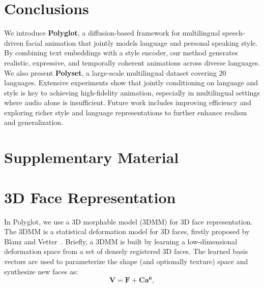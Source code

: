 \documentclass[a4paper, 10pt, conference]{ieeeconf}      %
\begin{document}
\section{Conclusions}
\label{sec:conclusions}
We introduce \textbf{Polyglot}, a diffusion-based framework for multilingual speech-driven facial animation that jointly models language and personal speaking style. By combining text embeddings with a style encoder, our method generates realistic, expressive, and temporally coherent animations across diverse languages.
We also present \textbf{Polyset}, a large-scale multilingual dataset covering 20 languages. Extensive experiments show that jointly conditioning on language and style is key to achieving high-fidelity animation, especially in multilingual settings where audio alone is insufficient.
Future work includes improving efficiency and exploring richer style and language representations to further enhance realism and generalization.

\clearpage
\appendix
\section*{Supplementary Material}

\section{3D Face Representation}
In Polyglot, we use a 3D morphable model (3DMM) for 3D face representation. The 3DMM is a statistical deformation model for 3D faces, firstly proposed by Blanz and Vetter~\cite{blanz1999morphable}. Briefly, a 3DMM is built by learning a low-dimensional deformation space from a set of densely registered 3D faces. The learned basis vectors are used to parameterize the shape (and optionally texture) space and synthesize new faces as:
%
\begin{equation}
    \mathbf{V} = \mathbf{F} + \mathbf{C}\mathbf{a^0},
    \label{eq:3dmm}
\end{equation}
\end{document}
